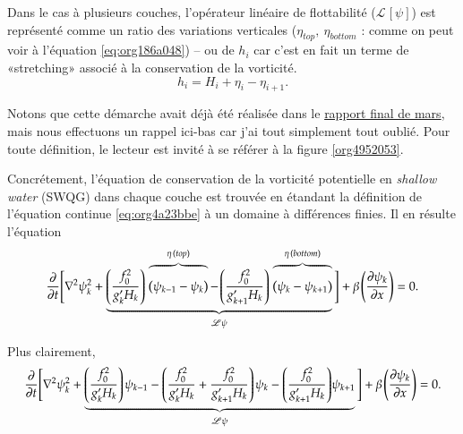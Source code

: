 \documentclass[10pt]{article}
\numberwithin{equation}{section}
\newcommand{\grande}{\vphantom{\frac{1}{xx}}}
\newcommand{\pt}{\hspace{1pt}} %
\begin{document}
Dans le cas à plusieurs couches, l'opérateur linéaire de flottabilité (\(\mathscr{L}\pt[\psi]\)) est représenté comme un ratio des variations verticales (\(\eta_{top},\ \eta_{bottom}\) : comme on peut voir à l'équation \ref{eq:org186a048}) -- ou de \(h_i\) car c'est en fait un terme de «stretching» associé à la conservation de la vorticité.
\begin{equation}
   h_i = H_i + \eta_i - \eta_{i+1}.
\end{equation}

Notons que cette démarche avait déjà été réalisée dans le \href{rapport-2023-03-31.pdf}{rapport final de mars}, mais nous effectuons un rappel ici-bas car j'ai tout simplement tout oublié.
Pour toute définition, le lecteur est invité à se référer à la figure \ref{org4952053}. \bigskip

Concrétement, l'équation de conservation de la vorticité potentielle en \emph{shallow water} (SWQG) dans chaque couche \citep[p.186]{vallis_2006} est trouvée en étandant la définition de l'équation continue \ref{eq:org4a23bbe} à un domaine à différences finies.
Il en résulte l'équation
\begin{equation}
\label{eq:org186a048}
   \pdv{}{t} \Bigg[ \laplacian{\psi^2_k} + \underbrace{\qty(\frac{f_0^2}{g_k' H_k})\pt \overbrace{\qty(\psi_{k-1}-\psi_k)\grande}^{\eta\pt(top)} -\pt \qty(\frac{f_0^2}{g_{k+1}' H_k})\pt \overbrace{\qty(\psi_{k} - \psi_{k+1})\grande}^{\eta\pt(bottom)}}_{\mathscr{L \psi}} \Bigg] + \beta\pt \qty(\pdv{\psi_k}{x}) = 0.
\end{equation}

Plus clairement,
\begin{equation}
   \pdv{}{t} \Bigg[ \laplacian{\psi^2_k} + \underbrace{\qty(\frac{f_0^2}{g_k' H_k})\pt \psi_{k-1} - \qty(\frac{f_0^2}{g_k' H_k} + \frac{f_0^2}{g_{k+1}' H_k}) \pt \psi_{k} - \qty(\frac{f_0^2}{g_{k+1}' H_k})\psi_{k+1}}_\mathscr{L\psi} \Bigg] + \beta\pt \qty(\pdv{\psi_k}{x}) = 0.
\end{equation}
\end{document}
